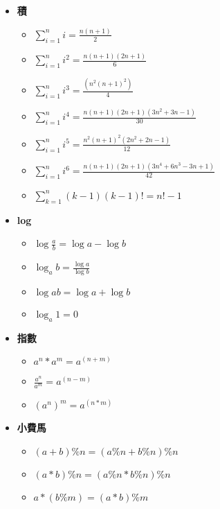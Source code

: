 \documentclass{article}
\begin{document}
\begin{itemize}
  \item \textbf{積}
  \begin{itemize}
    \item $\sum \limits_{i=1}^n i = \frac{n(n+1)}{2}$
    \item $\sum \limits_{i=1}^n i^2 = \frac{n(n+1)(2n+1)}{6}$
    \item $\sum \limits_{i=1}^n i^3 = \frac{(n^2(n+1)^2)}{4}$
    \item $\sum \limits_{i=1}^n i^4 = \frac{n(n+1)(2n+1)(3n^2+3n-1)}{30}$
    \item $\sum \limits_{i=1}^n i^5 = \frac{n^2(n+1)^2(2n^2+2n-1)}{12}$
    \item $\sum \limits_{i=1}^n i^6 = \frac{n(n+1)(2n+1)(3n^4+6n^3-3n+1)}{42}$
    \item $\sum \limits_{k=1}^n (k-1)(k-1)! = n!-1$
  \end{itemize}
  
  \item \textbf{log}
  \begin{itemize}
    \item $\log\frac{a}{b} = \log a - \log b$
    \item $\log_a b = \frac{\log a}{\log b}$
    \item $\log ab = \log a + \log b$
    \item $\log_a 1 = 0$
  \end{itemize}
  

  \item \textbf{指數}
  \begin{itemize}
    \item $a^n*a^m = a^(n+m)$
    \item $\frac{a^n}{a^m} = a^(n-m)$
    \item $(a^n)^m = a^(n*m)$
  \end{itemize}

  
  \item \textbf{小費馬}
  \begin{itemize}
    \item $(a+b)\%n = (a\%n+b\%n)\%n$
    \item $(a*b)\%n = (a\%n*b\%n)\%n$
    \item $a*(b\%m) = (a*b)\%m$
  \end{itemize}
\end{itemize}
\end{document}
